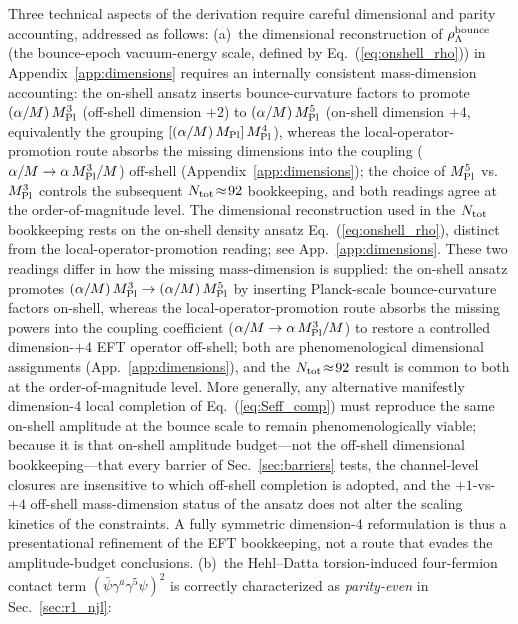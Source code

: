 \documentclass[aps,prd,twocolumn,superscriptaddress,showpacs,preprintnumbers,nofootinbib,longbibliography,floatfix]{revtex4-2}
\newcommand{\MPl}{M_{\rm Pl}}
\begin{document}
Three technical aspects of the derivation require careful dimensional and
parity accounting, addressed as follows:
(a)~the dimensional reconstruction of $\rho_\Lambda^{\rm bounce}$ (the
bounce-epoch vacuum-energy scale, defined by
Eq.~(\ref{eq:onshell_rho})) in Appendix~\ref{app:dimensions} requires an internally consistent mass-dimension
accounting: the on-shell ansatz inserts bounce-curvature factors to
promote $(\alpha/M)\,M_{\rm Pl}^3$ (off-shell dimension $+2$) to
$(\alpha/M)\,M_{\rm Pl}^5$ (on-shell dimension $+4$, equivalently the
grouping $[(\alpha/M)\,M_{\rm Pl}]\,M_{\rm Pl}^4$), whereas the
local-operator-promotion route absorbs the missing dimensions into the
coupling ($\alpha/M\to\alpha\,M_{\rm Pl}^{3}/M$) off-shell
(Appendix~\ref{app:dimensions}); the choice of $M_{\rm Pl}^{5}$ vs.\ $M_{\rm Pl}^{3}$ controls the
subsequent $N_{\rm tot}\!\approx\!92$ bookkeeping, and both readings agree
at the order-of-magnitude level.
The dimensional reconstruction used in the $N_{\rm tot}$ bookkeeping
rests on the on-shell density ansatz Eq.~(\ref{eq:onshell_rho}), distinct
from the local-operator-promotion reading; see App.~\ref{app:dimensions}.
These two readings differ in how the missing mass-dimension is supplied:
the on-shell ansatz promotes $(\alpha/M)\,\MPl^3 \to (\alpha/M)\,\MPl^5$ by
inserting Planck-scale bounce-curvature factors on-shell, whereas the
local-operator-promotion route absorbs the missing powers into the
coupling coefficient ($\alpha/M \to \alpha\,\MPl^{3}/M$) to restore a
controlled dimension-$+4$ EFT operator off-shell; both are phenomenological
dimensional assignments (App.~\ref{app:dimensions}), and the $N_{\rm tot}\!\approx\!92$
result is common to both at the order-of-magnitude level.
More generally, any alternative manifestly dimension-$4$ local completion of
Eq.~(\ref{eq:Seff_comp}) must reproduce the same on-shell amplitude at the
bounce scale to remain phenomenologically viable; because it is that on-shell
amplitude budget---not the off-shell dimensional bookkeeping---that every
barrier of Sec.~\ref{sec:barriers} tests, the channel-level closures are
insensitive to which off-shell completion is adopted, and the $+1$-vs-$+4$
off-shell mass-dimension status of the ansatz does not alter the scaling
kinetics of the constraints. A fully symmetric dimension-$4$ reformulation is
thus a presentational refinement of the EFT bookkeeping, not a route that
evades the amplitude-budget conclusions.
(b)~the Hehl--Datta
torsion-induced four-fermion contact term $(\bar\psi\gamma^a\gamma^5\psi)^2$
is correctly characterized as \emph{parity-even} in Sec.~\ref{sec:r1_njl}:
\end{document}
